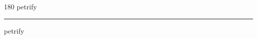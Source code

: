 
\begin{frame}
\begin{center}
\begin{turn}{180}
{\fontsize{2.5cm}{1em}\selectfont petrify}
\end{turn}
\vspace{1em}\par  
\hrule
\vspace{1em}\par  
{\fontsize{2.5cm}{1em}\selectfont petrify}
\end{center}
\end{frame}
